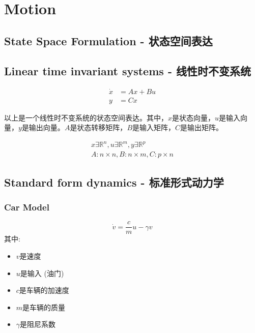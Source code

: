 \section{Motion}

\subsection{State Space Formulation - 状态空间表达}

\subsection{Linear time invariant systems - 线性时不变系统}
\begin{equation}
\begin{aligned}
\dot{x} &= Ax + Bu \\
y &= Cx
\end{aligned}
\end{equation}

以上是一个线性时不变系统的状态空间表达。其中，$x$是状态向量，$u$是输入向量，$y$是输出向量。$A$是状态转移矩阵，$B$是输入矩阵，$C$是输出矩阵。

\begin{equation}
\begin{aligned}
    x \exists \mathbb{R}^n, u \exists \mathbb{R}^m, y \exists \mathbb{R}^p \\
    A: n \times n, B: n \times m, C: p \times n
    \end{aligned}
\end{equation}

\subsection{Standard form dynamics - 标准形式动力学}

\subsubsection{Car Model}
\begin{equation}
    \dot{v} =  \frac{c}{m} u - \gamma v
\end{equation}
其中:
\begin{itemize}
    \item $v$是速度
    \item $u$是输入 (油门)
    \item $c$是车辆的加速度
    \item $m$是车辆的质量
    \item $\gamma$是阻尼系数
\end{itemize}

